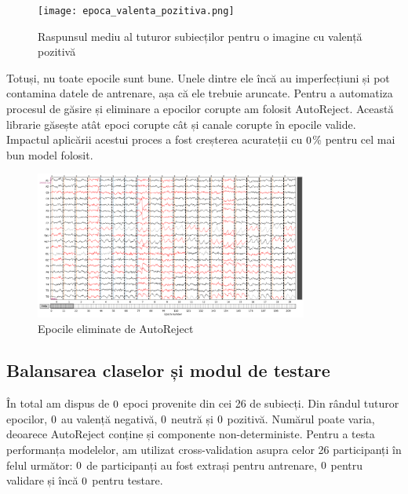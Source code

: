 \setlength{\abovecaptionskip}{0pt}
\setlength{\belowcaptionskip}{0pt}
\clearpage
\begin{figure}
    \centering
    \texttt{[image: epoca\_valenta\_pozitiva.png]}
    \caption{Raspunsul mediu al tuturor subiecților pentru o imagine cu valență pozitivă}
    \label{fig:enter-label}
\end{figure}

Totuși, nu toate epocile sunt bune. Unele dintre ele încă au imperfecțiuni și pot contamina datele de antrenare, așa că ele trebuie aruncate. Pentru a automatiza procesul de găsire și eliminare a epocilor corupte am folosit AutoReject\cite{AutoReject}. Această librarie găsește atât epoci corupte cât și canale corupte în epocile valide. Impactul aplicării acestui proces a fost creșterea acurateții cu $0$\% pentru cel mai bun model folosit.

\vspace{1em}
\begin{figure}[h]
    \centering
    \includegraphics[width=0.8\textwidth]{images/rezultat_autoreject.png}
    \caption{Epocile eliminate de AutoReject}
    \label{fig:vizualizare_filtru}
\end{figure}

\subsection{Balansarea claselor și modul de testare}

În total am dispus de $0$ epoci provenite din cei 26 de subiecți. Din rândul tuturor epocilor, $0$ au valență negativă, $0$ neutră și $0$ pozitivă. Numărul poate varia, deoarece AutoReject conține și componente non-deterministe. Pentru a testa performanța modelelor, am utilizat cross-validation asupra celor 26 participanți în felul următor: $0$ de participanți au fost extrași pentru antrenare, $0$ pentru validare și încă $0$ pentru testare.

